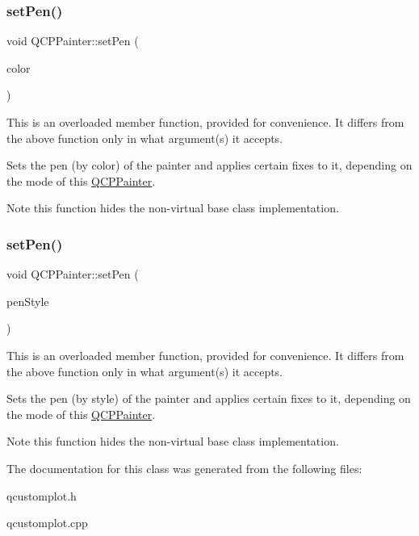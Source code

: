 \subsubsection{\texorpdfstring{set\+Pen()}{setPen()}\hspace{0.1cm}{\footnotesize\ttfamily [2/3]}}
{\footnotesize\ttfamily void Q\+C\+P\+Painter\+::set\+Pen (\begin{DoxyParamCaption}\item[{const Q\+Color \&}]{color }\end{DoxyParamCaption})}

This is an overloaded member function, provided for convenience. It differs from the above function only in what argument(s) it accepts.

Sets the pen (by color) of the painter and applies certain fixes to it, depending on the mode of this \hyperlink{classQCPPainter}{Q\+C\+P\+Painter}.

\begin{DoxyNote}{Note}
this function hides the non-\/virtual base class implementation. 
\end{DoxyNote}
\mbox{\label{classQCPPainter_a25e76095aae41da0d08035060e5f81ca}} 
\subsubsection{\texorpdfstring{set\+Pen()}{setPen()}\hspace{0.1cm}{\footnotesize\ttfamily [3/3]}}
{\footnotesize\ttfamily void Q\+C\+P\+Painter\+::set\+Pen (\begin{DoxyParamCaption}\item[{Qt\+::\+Pen\+Style}]{pen\+Style }\end{DoxyParamCaption})}

This is an overloaded member function, provided for convenience. It differs from the above function only in what argument(s) it accepts.

Sets the pen (by style) of the painter and applies certain fixes to it, depending on the mode of this \hyperlink{classQCPPainter}{Q\+C\+P\+Painter}.

\begin{DoxyNote}{Note}
this function hides the non-\/virtual base class implementation. 
\end{DoxyNote}


The documentation for this class was generated from the following files\+:\begin{DoxyCompactItemize}
\item 
qcustomplot.\+h\item 
qcustomplot.\+cpp\end{DoxyCompactItemize}
